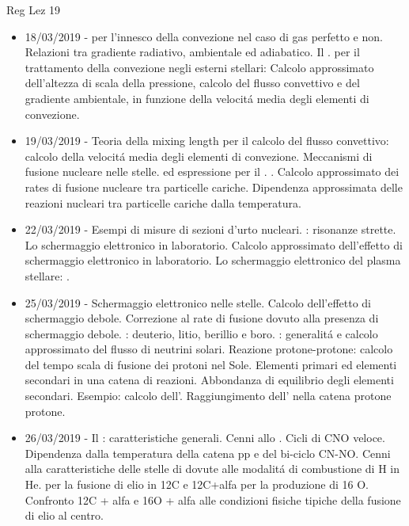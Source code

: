 \begin{frame}[allowframebreaks]{Reg Lez 19}
\begin{itemize}
\item 18/03/2019 -  per l'innesco della convezione nel caso di gas perfetto e non. Relazioni tra gradiente radiativo, ambientale ed adiabatico. Il .  per il trattamento della convezione negli esterni stellari: Calcolo approssimato dell'altezza di scala della pressione, calcolo del flusso convettivo e del gradiente ambientale, in funzione della velocit\'a media degli elementi di convezione.
\item 19/03/2019 - Teoria della mixing length per il calcolo del flusso convettivo: calcolo della velocit\'a media degli elementi di convezione. Meccanismi di fusione nucleare nelle stelle.  ed espressione per il . . Calcolo approssimato dei rates di fusione nucleare tra particelle cariche. Dipendenza approssimata delle reazioni nucleari tra particelle cariche dalla temperatura.
\item 22/03/2019 - Esempi di misure di sezioni d'urto nucleari. : risonanze strette. Lo schermaggio elettronico in laboratorio. Calcolo approssimato dell'effetto di schermaggio elettronico in laboratorio. Lo schermaggio elettronico del plasma stellare: .
\item 25/03/2019 - Schermaggio elettronico nelle stelle. Calcolo dell'effetto di schermaggio debole. Correzione al rate di fusione dovuto alla presenza di schermaggio debole. : deuterio, litio, berillio e boro. : generalit\'a e calcolo approssimato del flusso di neutrini solari. Reazione protone-protone: calcolo del tempo scala di fusione dei protoni nel Sole. Elementi primari ed elementi secondari in una catena di reazioni. Abbondanza di equilibrio degli elementi secondari. Esempio: calcolo dell'. Raggiungimento dell' nella catena protone protone.
\item 26/03/2019 - Il : caratteristiche generali. Cenni allo . Cicli di CNO veloce. Dipendenza dalla temperatura della catena pp e del bi-ciclo CN-NO. Cenni alla caratteristiche delle stelle di  dovute alle modalit\'a di combustione di H in He.  per la fusione di elio in 12C e 12C+alfa per la produzione di 16 O. Confronto 12C + alfa e 16O + alfa alle condizioni fisiche tipiche della fusione di elio al centro.

\end{itemize}
\end{frame}
